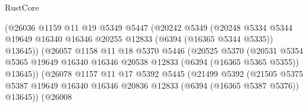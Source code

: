 \begin{lexlean}{RustCore}
\begin{coremodule}
                                  (@26036
                                    @1159
                                    @11
                                    @19
                                    @5349
                                    @5447
                                    (@20242
                                      @5349
                                      (@20248
                                        @5334
                                        @5344
                                        @19649
                                        @16340
                                        @16346
                                        @20255
                                        @12833
                                        (@6394 (@16365 @5344 @5335))
                                        @13645))
                                    (@26057
                                      @1158
                                      @11
                                      @18
                                      @5370
                                      @5446
                                      (@20525
                                        @5370
                                        (@20531
                                          @5354
                                          @5365
                                          @19649
                                          @16340
                                          @16346
                                          @20538
                                          @12833
                                          (@6394 (@16365 @5365 @5355))
                                          @13645))
                                      (@26078
                                        @1157
                                        @11
                                        @17
                                        @5392
                                        @5445
                                        (@21499
                                          @5392
                                          (@21505
                                            @5375
                                            @5387
                                            @19649
                                            @16340
                                            @16346
                                            @20836
                                            @12833
                                            (@6394 (@16365 @5387 @5376))
                                            @13645))
                                        (@26008

\end{coremodule}
\end{lexlean}
